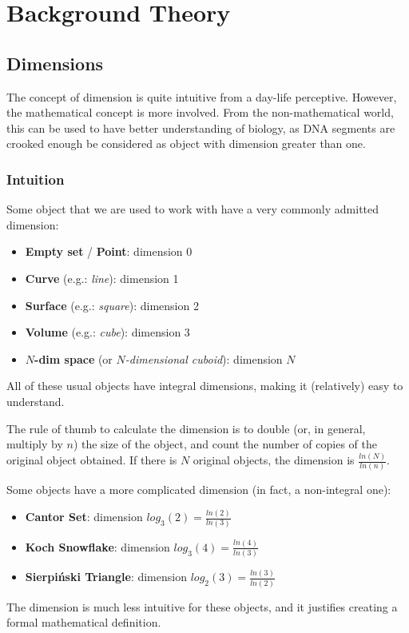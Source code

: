 \section{Background Theory}


\subsection{Dimensions}
The concept of dimension is quite intuitive from a day-life perceptive.
However, the mathematical concept is more involved.
From the non-mathematical world, this can be used to have better understanding of biology, as DNA segments are crooked enough be considered as object with dimension greater than one.

\subsubsection{Intuition}
Some object that we are used to work with have a very commonly admitted dimension:
\begin{itemize}
	\item \textbf{Empty set} / \textbf{Point}: dimension 0
	\item \textbf{Curve} (e.g.: \textit{line}): dimension 1
	\item \textbf{Surface} (e.g.: \textit{square}): dimension 2
	\item \textbf{Volume} (e.g.: \textit{cube}): dimension 3
	\item \textbf{$N$-dim space} (or \textit{$N$-dimensional cuboid}): dimension $N$
\end{itemize}
All of these usual objects have integral dimensions, making it (relatively) easy to understand.

The rule of thumb to calculate the dimension is to double (or, in general, multiply by $n$) the size of the object, and count the number of copies of the original object obtained.
If there is $N$ original objects, the dimension is $\frac{ln(N)}{ln(n)}$.

Some objects have a more complicated dimension (in fact, a non-integral one):
\begin{itemize}
	\item \textbf{Cantor Set}: dimension $log_3(2) = \frac{ln(2)}{ln(3)}$
	\item \textbf{Koch Snowflake}: dimension $log_3(4) = \frac{ln(4)}{ln(3)}$
	\item \textbf{Sierpiński Triangle}: dimension $log_2(3) = \frac{ln(3)}{ln(2)}$
\end{itemize}
The dimension is much less intuitive for these objects, and it justifies creating a formal mathematical definition.

